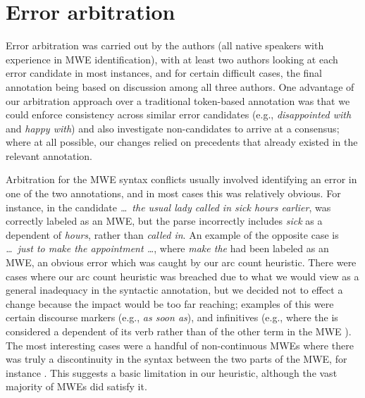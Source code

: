 \documentclass[output=paper,modfonts,nonflat]{langsci/langscibook}
\begin{document}
\section{Error arbitration}

Error arbitration was carried out by the authors (all native  speakers with experience in MWE identification), with at least two authors looking at each error candidate in most instances, and for certain difficult cases, the final annotation being based on discussion among all three authors. One advantage of our arbitration approach over a traditional token-based annotation was that we could enforce consistency across similar error candidates (e.g., \textit{disappointed with} and \textit{happy with}) and also investigate non-candidates to arrive at a consensus; where at all possible, our changes relied on precedents that already existed in the relevant annotation. 

Arbitration for the MWE syntax conflicts usually involved identifying an error in one of the two annotations, and in most cases this was relatively obvious. For instance, in the candidate \textit{\ldots~the usual lady called in sick hours earlier},  was correctly labeled as an MWE, but the parse incorrectly includes \textit{sick} as a dependent of \textit{hours}, rather than \textit{called in}. An example of the opposite case is \textit{\ldots~just to make the appointment \ldots}, where  \textit{make the} had been labeled as an MWE, an obvious error which was caught by our arc count heuristic. There were cases where our arc count heuristic was breached due to what we would view as a general inadequacy in the syntactic annotation, but we decided not to effect a change because the impact would be too far reaching; examples of this were certain discourse markers (e.g., \textit{as soon as}), and infinitives (e.g.,   where the  is considered a dependent of its verb rather than of the other term in the MWE ). The most interesting cases were a handful of non-continuous MWEs where there was truly a discontinuity in the syntax between the two parts of the MWE, for instance . This suggests a basic limitation in our heuristic, although the vast majority of MWEs did satisfy it.
\end{document}
